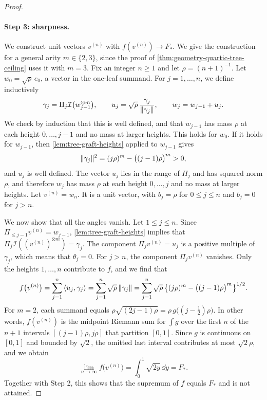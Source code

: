 \begin{proof}
\paragraph{Step 3: sharpness.}
We construct unit vectors $v^{(n)}$ with $f(v^{(n)})\to F_*$. We give the construction for a general arity $m\in\{2,3\}$, since the proof of \cref{thm:geometry-quartic-tree-ceiling} uses it with $m=3$. Fix an integer $n\ge1$ and let $\rho=(n+1)^{-1}$. Let $w_0=\sqrt\rho\,e_0$, a vector in the one-leaf summand. For $j=1,\dots,n$, we define inductively
\[
 \gamma_j=\Pi_j\mathcal I\bigl(w_{j-1}^{\otimes m}\bigr),\qquad u_j=\sqrt\rho\,\frac{\gamma_j}{\lVert\gamma_j\rVert},\qquad w_j=w_{j-1}+u_j.
\]
We check by induction that this is well defined, and that $w_{j-1}$ has mass $\rho$ at each height $0,\dots,j-1$ and no mass at larger heights. This holds for $w_0$. If it holds for $w_{j-1}$, then \cref{lem:tree-graft-heights} applied to $w_{j-1}$ gives
\[
 \lVert\gamma_j\rVert^2=(j\rho)^m-\bigl((j-1)\rho\bigr)^m>0,
\]
and $u_j$ is well defined. The vector $u_j$ lies in the range of $\Pi_j$ and has squared norm $\rho$, and therefore $w_j$ has mass $\rho$ at each height $0,\dots,j$ and no mass at larger heights. Let $v^{(n)}=w_n$. It is a unit vector, with $b_j=\rho$ for $0\le j\le n$ and $b_j=0$ for $j>n$.

We now show that all the angles vanish. Let $1\le j\le n$. Since $\Pi_{\le j-1}v^{(n)}=w_{j-1}$, \cref{lem:tree-graft-heights} implies that $\Pi_j\mathcal I((v^{(n)})^{\otimes m})=\gamma_j$. The component $\Pi_jv^{(n)}=u_j$ is a positive multiple of $\gamma_j$, which means that $\theta_j=0$. For $j>n$, the component $\Pi_jv^{(n)}$ vanishes. Only the heights $1,\dots,n$ contribute to $f$, and we find that
\begin{equation}\label{eq:tree-sharp-value}
 f\bigl(v^{(n)}\bigr)=\sum_{j=1}^n\left\langle u_j,\gamma_j\right\rangle=\sum_{j=1}^n\sqrt\rho\,\lVert\gamma_j\rVert
 =\sum_{j=1}^n\sqrt\rho\,\bigl\{(j\rho)^m-\bigl((j-1)\rho\bigr)^m\bigr\}^{1/2}.
\end{equation}
For $m=2$, each summand equals $\rho\sqrt{(2j-1)\rho}=\rho\,g\bigl((j-\frac12)\rho\bigr)$. In other words, $f(v^{(n)})$ is the midpoint Riemann sum for $\int g$ over the first $n$ of the $n+1$ intervals $[(j-1)\rho,j\rho]$ that partition $[0,1]$. Since $g$ is continuous on $[0,1]$ and bounded by $\sqrt2$, the omitted last interval contributes at most $\sqrt2\rho$, and we obtain
\[
 \lim_{n\to\infty}f\bigl(v^{(n)}\bigr)=\int_0^1\sqrt{2y}\,\dd y=F_*.
\]
Together with Step 2, this shows that the supremum of $f$ equals $F_*$ and is not attained.
\end{proof}

